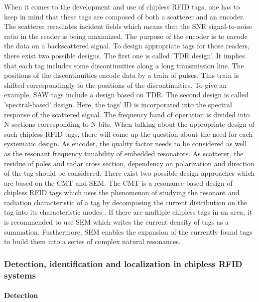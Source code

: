 When it comes to the development and use of chipless RFID tags, one has to keep in mind that these tags are composed of both a scatterer and an encoder. The scatterer reradiates incident fields which means that the \ac{SNR} signal-to-noise ratio in the reader is being maximized. The purpose of the encoder is to encode the data on a backscattered signal. 
To design appropriate tags for those readers, there exist two possible designs. The first one is called '\ac{TDR} design'. It implies that each tag includes some discontinuities along a long transmission line. The positions of the discontinuities encode data by a train of pulses. This train is shifted correspondingly to the positions of the discontinuities. To give an example, \ac{SAW} tags include a design based on TDR. The second design is called 'spectral-based' design. Here, the tags' ID is incorporated into the spectral response of the scattered signal. The frequency band of operation is divided into N sections corresponding to N bits. When talking about the appropriate design of such chipless RFID tags, there will come up the question about the need for each systematic design. As encoder, the quality factor needs to be considered as well as the resonant frequency tunability of embedded resonators. As scatterer, the residue of poles and radar cross section, dependency on polarization and direction of the tag should be considered. There exist two possible design approaches which are based on the \ac{CMT} and \ac{SEM}. The CMT is a resonance-based design of chipless RFID tags which uses the phenomenon of studying the resonant and radiation characteristic of a tag by decomposing the current distribution on the tag into its characteristic modes \cite[p.81 ff.]{chipless}. If there are multiple chipless tags in an area, it is recommended to use SEM which writes the current density of tags as a summation. Furthermore, SEM enables the expansion of the currently found tags to build them into a series of complex natural resonances.

\subsubsection{Detection, identification and localization in chipless RFID systems}

\paragraph{Detection}

